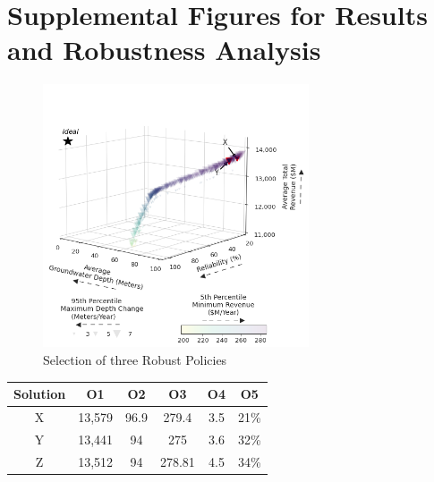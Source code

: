 \documentclass[11pt,a4paper]{article}
\begin{document}
\section{Supplemental Figures for Results and Robustness Analysis}

\begin{figure}[H]
    \centering
    \includegraphics[width=0.7\textwidth]{3d_selected_robust.png}
    \caption{Selection of three Robust Policies}
    \label{fig:m1esh1}
\end{figure}


\begin{center}
\begin{tabular}{ |c|c|c|c|c|c| }
 \hline
 Solution & O1 & O2 & O3 & O4 & O5 \\ 
 \hline
X &  13,579 & 96.9& 279.4 & 3.5 & 21\%\\
Y & 13,441 & 94 & 275 & 3.6 & 32\% \\
Z &  13,512 & 94 & 278.81 & 4.5 & 34\% \\
\hline
\end{tabular}
\end{center}
\end{document}
